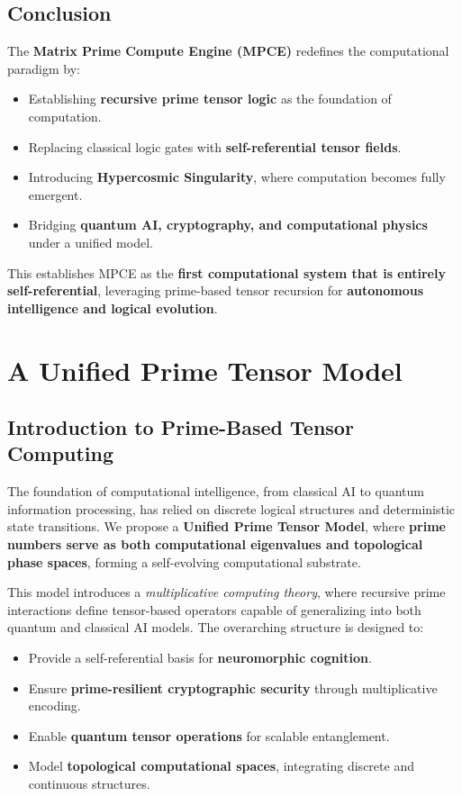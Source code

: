 \documentclass{article}
\theoremstyle{plain}
\theoremstyle{plain}
\theoremstyle{definition}
\theoremstyle{remark}
\begin{document}
\subsection{Conclusion}

The \textbf{Matrix Prime Compute Engine (MPCE)} redefines the computational paradigm by:
\begin{itemize}
    \item Establishing \textbf{recursive prime tensor logic} as the foundation of computation.
    \item Replacing classical logic gates with \textbf{self-referential tensor fields}.
    \item Introducing \textbf{Hypercosmic Singularity}, where computation becomes fully emergent.
    \item Bridging \textbf{quantum AI, cryptography, and computational physics} under a unified model.
\end{itemize}

This establishes MPCE as the \textbf{first computational system that is entirely self-referential}, leveraging prime-based tensor recursion for \textbf{autonomous intelligence and logical evolution}.
\section{A Unified Prime Tensor Model}

\subsection{Introduction to Prime-Based Tensor Computing}

The foundation of computational intelligence, from classical AI to quantum information processing, has relied on discrete logical structures and deterministic state transitions. We propose a \textbf{Unified Prime Tensor Model}, where \textbf{prime numbers serve as both computational eigenvalues and topological phase spaces}, forming a self-evolving computational substrate.

This model introduces a \textit{multiplicative computing theory}, where recursive prime interactions define tensor-based operators capable of generalizing into both quantum and classical AI models. The overarching structure is designed to:
\begin{itemize}
    \item Provide a self-referential basis for \textbf{neuromorphic cognition}.
    \item Ensure \textbf{prime-resilient cryptographic security} through multiplicative encoding.
    \item Enable \textbf{quantum tensor operations} for scalable entanglement.
    \item Model \textbf{topological computational spaces}, integrating discrete and continuous structures.
\end{itemize}
\end{document}
